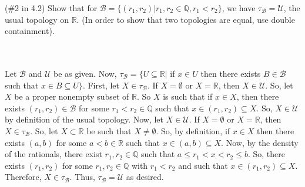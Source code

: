 (\#2 in 4.2) Show that for $\mathcal{B} = \{(r_1,r_2)| r_1,r_2 \in \mathbb{Q}, r_1 < r_2\}$, we have
$\tau_{\mathcal{B}} = \mathcal{U}$, the usual topology on $\mathbb{R}$. (In order to show that two
topologies are equal, use double containment).\\\\

\begin{solution}\renewcommand{\qedsymbol}{}\ \\
    Let $\mathcal{B}$ and $\mathcal{U}$ be as given. Now, $\tau_{\mathcal{B}}=\{U\subseteq\mathbb{R}|$
    if $x\in U$ then there exists $B\in\mathcal{B}$ such that $x\in B\subseteq U\}$. First, let
    $X\in\tau_{\mathcal{B}}$. If $X=\emptyset$ or $X=\mathbb{R}$, then $X\in \mathcal{U}$. So, let $X$
    be a proper nonempty subset of $\mathbb{R}$. So $X$ is such that if $x\in X$, then there exists
    $(r_1,r_2)\in\mathcal{B}$ for some $r_1<r_2\in\mathbb{Q}$ such that $x\in(r_1,r_2)\subseteq X$. So,
    $X\in\mathcal{U}$ by definition of the usual topology. Now, let $X\in\mathcal{U}$. If $X=\emptyset$
    or $X=\mathbb{R}$, then $X\in\tau_{\mathcal{B}}$. So, let $X\subset\mathbb{R}$ be such that
    $X\neq\emptyset$. So, by definition, if $x\in X$ then there exists $(a,b)$ for some
    $a<b\in\mathbb{R}$ such that $x\in(a,b)\subseteq X$. Now, by the density of the rationals, there
    exist $r_1,r_2\in\mathbb{Q}$ such that $a\leq r_1<x<r_2\leq b$. So, there exists $(r_1,r_2)$ for
    some $r_1,r_2\in\mathbb{Q}$ with $r_1<r_2$ and such that $x\in(r_1,r_2)\subseteq X$. Therefore,
    $X\in\tau_{\mathcal{B}}$. Thus, $\tau_{\mathcal{B}} = \mathcal{U}$ as desired.

\end{solution}